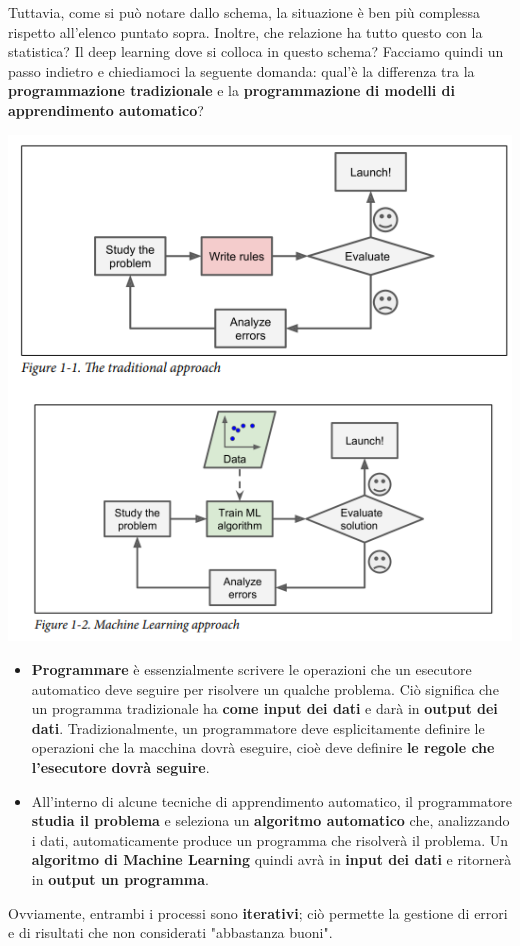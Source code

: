 \documentclass[12pt]{article}
\begin{document}
Tuttavia, come si può notare dallo schema, la situazione è ben più complessa rispetto all'elenco puntato sopra.
Inoltre, che relazione ha tutto questo con la statistica? Il deep learning dove si colloca in questo schema?
Facciamo quindi un passo indietro e chiediamoci la seguente domanda: qual'è la differenza tra la \textbf{programmazione tradizionale} e la \textbf{programmazione di modelli di apprendimento automatico}?
\begin{center}
    \includegraphics[width =0.65\linewidth]{Images/59.PNG}
\end{center}
\begin{itemize}
    \item \textbf{Programmare} è essenzialmente scrivere le operazioni che un esecutore automatico deve seguire per risolvere un qualche problema. Ciò significa che un programma tradizionale ha \textbf{come input dei dati} e darà in \textbf{output dei dati}.
    Tradizionalmente, un programmatore deve esplicitamente definire le operazioni che la macchina dovrà eseguire, cioè deve definire \textbf{le regole che l'esecutore dovrà seguire}.
    \item All'interno di alcune tecniche di apprendimento automatico, il programmatore \textbf{studia il problema} e seleziona un \textbf{algoritmo automatico} che, analizzando i dati, automaticamente produce un programma che risolverà il problema. Un \textbf{algoritmo di Machine Learning} quindi avrà in \textbf{input dei dati} e ritornerà in \textbf{output un programma}.
\end{itemize}
Ovviamente, entrambi i processi sono \textbf{iterativi}; ciò permette la gestione di errori e di risultati che non considerati "abbastanza buoni".
\end{document}
